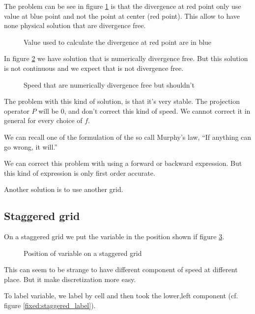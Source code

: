 The problem can be see in figure \ref{fixed:unstaggered_div} is that the divergence at red point only use value at blue point and not the point at center (red point).
This allow to have none physical solution that are divergence free.

\begin{figure}
\caption{Value used to calculate the divergence at red point are in blue}
\label{fixed:unstaggered_div}
\end{figure}

In figure \ref{fixed:unstaggered_div2} we have solution that is numerically divergence free. But this solution is not continuous and we expect that is not divergence free.

\begin{figure}
\caption{Speed that are numerically divergence free but shouldn't}
\label{fixed:unstaggered_div2}
\end{figure}

The problem with this kind of solution, is that it's very stable.
The projection operator $P$ will be 0, and don't correct this kind of speed. We cannot correct it in general for every choice of $f$.

We can recall one of the formulation of the so call Murphy's law, ``If anything can go wrong, it will.''

We can correct this problem with using a forward or backward expression. But this kind of expression is only first order accurate.

Another solution is to use another grid.

\subsection{Staggered grid}

On a staggered grid we put the variable in the position shown if figure \ref{fixed:staggered}.

\begin{figure}
\caption{Position of variable on a staggered grid}
\label{fixed:staggered}
\end{figure}

This can seem to be strange to have different component of speed at different place. But it make discretization more easy.

To label variable, we label by cell and then took the lower,left component (cf. figure \ref{fixed:staggered_label}).

